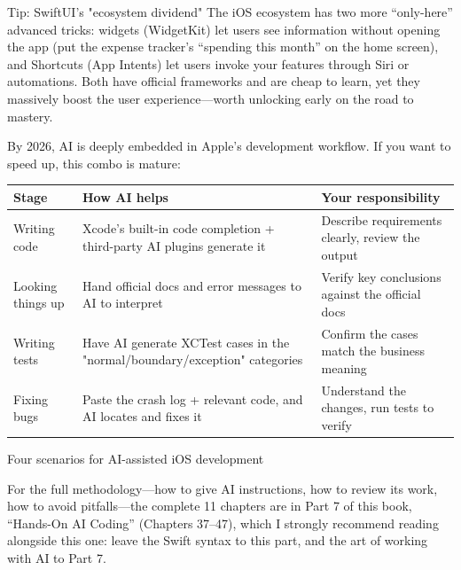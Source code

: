 \begin{tcbinfo}{Tip: SwiftUI's "ecosystem dividend"}
The iOS ecosystem has two more “only-here” advanced tricks: widgets (WidgetKit) let users see information without opening the app (put the expense tracker's “spending this month” on the home screen), and Shortcuts (App Intents) let users invoke your features through Siri or automations. Both have official frameworks and are cheap to learn, yet they massively boost the user experience—worth unlocking early on the road to mastery.

\end{tcbinfo}


By 2026, AI is deeply embedded in Apple's development workflow. If you want to speed up, this combo is mature:

\begin{center}
\begin{tabularx}{\linewidth}{|X|X|X|}
\hline
\textbf{Stage} & \textbf{How AI helps} & \textbf{Your responsibility} \tabularnewline
\hline
Writing code & Xcode's built-in code completion + third-party AI plugins generate it & Describe requirements clearly, review the output \tabularnewline
Looking things up & Hand official docs and error messages to AI to interpret & Verify key conclusions against the official docs \tabularnewline
Writing tests & Have AI generate XCTest cases in the "normal/boundary/exception" categories & Confirm the cases match the business meaning \tabularnewline
Fixing bugs & Paste the crash log + relevant code, and AI locates and fixes it & Understand the changes, run tests to verify \tabularnewline
\hline
\end{tabularx}
\end{center}

\begin{center}\small\color{gray}Four scenarios for AI-assisted iOS development\end{center}

For the full methodology—how to give AI instructions, how to review its work, how to avoid pitfalls—the complete 11 chapters are in Part 7 of this book, “Hands-On AI Coding” (Chapters 37–47), which I strongly recommend reading alongside this one: leave the Swift syntax to this part, and the art of working with AI to Part 7.

